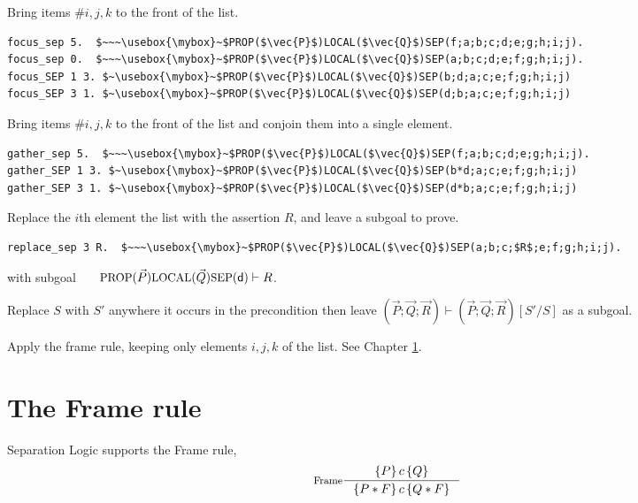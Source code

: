 \documentclass[12pt,fleqn,openany,oneside,showtrims]{memoir}
\newcommand{\ychapter}[2]{\chapter[#1]{#1 \hfill \normalsize #2}}
\begin{document}
\begin{description}\setlength{\itemsep}{2ex}
\item[$\mathsf{focus\_SEP}~i~j~k$.]
Bring items \#$i,j,k$ to the front of the \SEP{} list.
\begin{lstlisting}
focus_sep 5.  $~~~\usebox{\mybox}~$PROP($\vec{P}$)LOCAL($\vec{Q}$)SEP(f;a;b;c;d;e;g;h;i;j).
focus_sep 0.  $~~~\usebox{\mybox}~$PROP($\vec{P}$)LOCAL($\vec{Q}$)SEP(a;b;c;d;e;f;g;h;i;j).
focus_SEP 1 3. $~\usebox{\mybox}~$PROP($\vec{P}$)LOCAL($\vec{Q}$)SEP(b;d;a;c;e;f;g;h;i;j)
focus_SEP 3 1. $~\usebox{\mybox}~$PROP($\vec{P}$)LOCAL($\vec{Q}$)SEP(d;b;a;c;e;f;g;h;i;j)
\end{lstlisting}
\item[$\mathsf{gather\_SEP}~i~j~k$.]
Bring items \#$i,j,k$ to the front of the \SEP{} list
and conjoin them into a single element.
\begin{lstlisting}
gather_sep 5.  $~~~\usebox{\mybox}~$PROP($\vec{P}$)LOCAL($\vec{Q}$)SEP(f;a;b;c;d;e;g;h;i;j).
gather_SEP 1 3. $~\usebox{\mybox}~$PROP($\vec{P}$)LOCAL($\vec{Q}$)SEP(b*d;a;c;e;f;g;h;i;j)
gather_SEP 3 1. $~\usebox{\mybox}~$PROP($\vec{P}$)LOCAL($\vec{Q}$)SEP(d*b;a;c;e;f;g;h;i;j)
\end{lstlisting}
\item[$\mathsf{replace\_SEP}~i~R$.]
Replace the $i$th element the \SEP{} list
with the assertion $R$, and leave a subgoal to prove.
\begin{lstlisting}
replace_sep 3 R.  $~~~\usebox{\mybox}~$PROP($\vec{P}$)LOCAL($\vec{Q}$)SEP(a;b;c;$R$;e;f;g;h;i;j).
\end{lstlisting}
with subgoal~~~ $\mbox{\small PROP}(\vec{P})\mbox{\small LOCAL}(\vec{Q})\mbox{\small SEP}(\textsf{d}) \vdash R$.
\item[$\mathsf{replace\_in\_pre}~S~S'$.]
Replace $S$ with $S'$ anywhere it occurs in the precondition
then leave 
$(\vec{P};\vec{Q};\vec{R}) \vdash (\vec{P};\vec{Q};\vec{R})[S'/S]$
as a subgoal.
\item[$\mathsf{frame\_SEP}~i~j~k.$]
Apply the frame rule, keeping only
elements $i,j,k$ of the \SEP{} list.  See Chapter \ref{refcard:frame}.
\end{description}

\ychapter{The Frame rule}{}
\label{refcard:frame}

Separation Logic supports the Frame rule,
\[\inference[Frame]{\triple{P}{c}{Q}}{\triple{P*F}{c}{Q*F}}\]
\end{document}
